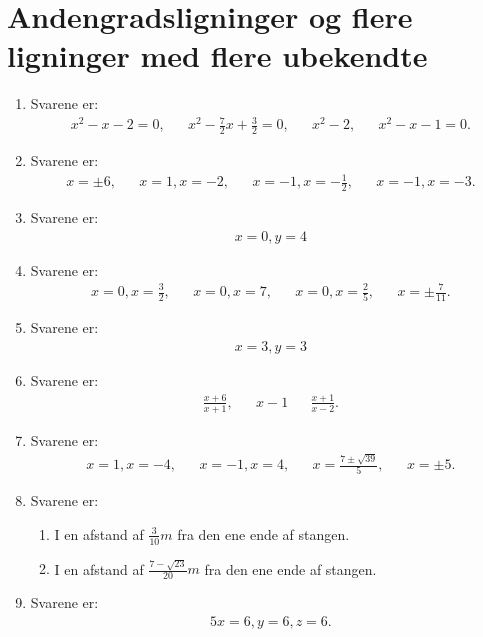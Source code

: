 \section{Andengradsligninger og flere ligninger med flere ubekendte}
 \begin{enumerate}
\item Svarene er:
\begin{align*}
x^2-x-2=0,&& x^2-\frac{7}{2}x+\frac{3}{2}=0,&& x^2-2 ,&& x^2-x-1=0.
\end{align*}

\item Svarene er:
\begin{align*}
x=\pm 6,&&x=1,x=-2,&& x=-1,x=-\frac{1}{2},&& x=-1,x=-3.
\end{align*}

\item Svarene er:
\begin{align*}
x=0,y=4
\end{align*}
\item Svarene er:
\begin{align*}
x=0,x=\frac{3}{2},&& x=0, x=7,&& x=0,x=\frac{2}{5},&& x=\pm \frac{7}{11}.
\end{align*}

\item Svarene er:
\begin{align*}
x=3,y=3
\end{align*}

\item Svarene er:
\begin{align*}
\frac{x+6}{x+1},&& x-1&&\frac{x+1}{x-2}.
\end{align*}


\item Svarene er:
\begin{align*}
x=1,x=-4,&&x=-1,x=4,&&  x=\frac{7\pm \sqrt{39}}{5},&& x=\pm 5.
\end{align*}



\item Svarene er:
\begin{enumerate}
\item I en afstand af $\frac{3}{10}m$ fra den ene ende af stangen.
\item I en afstand af $\frac{7-\sqrt{23}}{20}m$ fra den ene ende af stangen.
\end{enumerate}

\item Svarene er:
\begin{alignat*}{5}
x=6,y=6,z=6.
\end{alignat*}



\end{enumerate}
